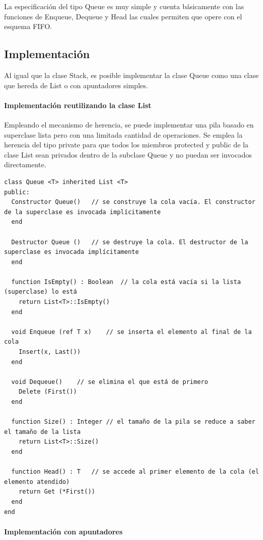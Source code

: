 La especificación del tipo Queue es muy simple y cuenta básicamente con las funciones de Enqueue, Dequeue y Head las cuales permiten que opere con el esquema FIFO.

\subsection{Implementación}

Al igual que la clase Stack, es posible implementar la clase Queue como una clase que hereda de List o con apuntadores simples.

\paragraph{Implementación reutilizando la clase List}

Empleando el mecanismo de herencia, se puede implementar una pila basado en superclase lista pero con una limitada cantidad de operaciones. Se emplea la herencia del tipo private para que todos los miembros protected y public de la clase List sean privados dentro de la subclase Queue y no puedan ser invocados directamente.

\begin{lstlisting}[upquote=true, language=pseudo]
class Queue <T> inherited List <T>
public:
  Constructor Queue()	// se construye la cola vacía. El constructor de la superclase es invocada implícitamente
  end

  Destructor Queue ()	// se destruye la cola. El destructor de la superclase es invocada implícitamente
  end

  function IsEmpty() : Boolean	// la cola está vacía si la lista (superclase) lo está
    return List<T>::IsEmpty()
  end

  void Enqueue (ref T x)	// se inserta el elemento al final de la cola
    Insert(x, Last())
  end

  void Dequeue()	// se elimina el que está de primero
    Delete (First())
  end

  function Size() : Integer	// el tamaño de la pila se reduce a saber el tamaño de la lista
    return List<T>::Size()
  end

  function Head() : T	// se accede al primer elemento de la cola (el elemento atendido)
    return Get (*First())
  end
end
\end{lstlisting}

\paragraph{Implementación con apuntadores}

